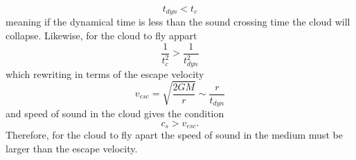 \documentclass[11pt]{article}
\begin{document}
\begin{equation}
 t_{dyn} < t_{c}
\end{equation}
meaning if the dynamical time is less than the sound crossing time the cloud will collapse.
Likewise, for the cloud to fly appart
\begin{equation}
  \frac{1}{t_{c}^{2}} > \frac{1}{t_{dyn}^{2}}
\end{equation}
which rewriting in terms of the escape velocity
\begin{equation}
 v_{esc} = \sqrt{\frac{2 G M}{r}} \sim \frac{r}{t_{dyn}}
\end{equation}
and speed of sound in the cloud gives the condition
\begin{equation}
 c_{s} > v_{esc}.
\end{equation}
Therefore,  for the cloud to fly apart the speed of sound in the medium must be larger than the escape velocity.
\end{document}
